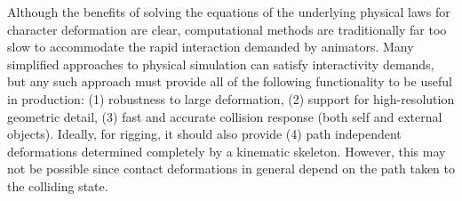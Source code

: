 

Although the benefits of solving the equations of the underlying physical laws for character deformation are clear, computational methods are traditionally far too slow to accommodate the rapid interaction demanded by animators. Many simplified approaches to physical simulation can satisfy interactivity demands, but any such approach must provide all of the following functionality to be useful in production: (1) robustness to large deformation, (2) support for high-resolution geometric detail, (3) fast and accurate collision response (both self and external objects). Ideally, for rigging, it should also provide (4) path independent deformations determined completely by a kinematic skeleton. However, this may not be possible since contact deformations in general depend on the path taken to the colliding state.


